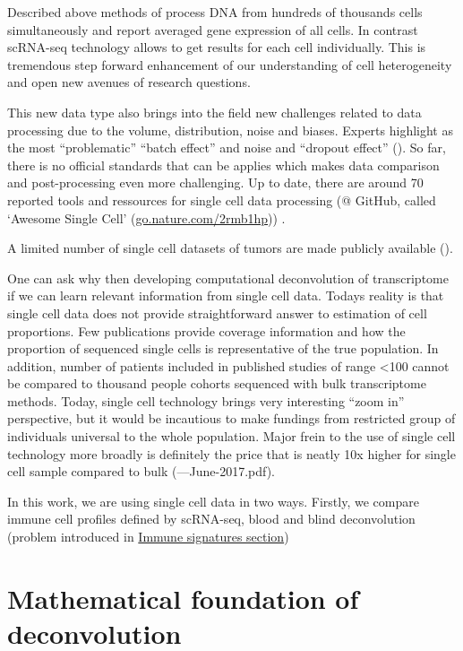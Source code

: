 \documentclass[12pt,]{book}
\theoremstyle{definition}
\theoremstyle{definition}
\theoremstyle{definition}
\theoremstyle{remark}
\begin{document}
Described above methods of process DNA from hundreds of thousands cells
simultaneously and report averaged gene expression of all cells. In
contrast scRNA-seq technology allows to get results for each cell
individually. This is tremendous step forward enhancement of our
understanding of cell heterogeneity and open new avenues of research
questions.

This new data type also brings into the field new challenges related to
data processing due to the volume, distribution, noise and biases.
Experts highlight as the most ``problematic'' ``batch effect'' and noise
and ``dropout effect''
(\citet{https://www.nature.com/news/single-cell-sequencing-made-simple-1.22233}).
So far, there is no official standards that can be applies which makes
data comparison and post-processing even more challenging. Up to date,
there are around 70 reported tools and ressources for single cell data
processing (@ GitHub, called `Awesome Single Cell'
(\href{http://go.nature.com/2rmb1hp}{go.nature.com/2rmb1hp})) .

A limited number of single cell datasets of tumors are made publicly
available (\citet{TABLE}).

One can ask why then developing computational deconvolution of
transcriptome if we can learn relevant information from single cell
data. Todays reality is that single cell data does not provide
straightforward answer to estimation of cell proportions. Few
publications provide coverage information and how the proportion of
sequenced single cells is representative of the true population. In
addition, number of patients included in published studies of range
\textless{}100 cannot be compared to thousand people cohorts sequenced
with bulk transcriptome methods. Today, single cell technology brings
very interesting ``zoom in'' perspective, but it would be incautious to
make fundings from restricted group of individuals universal to the
whole population. Major frein to the use of single cell technology more
broadly is definitely the price that is neatly 10x higher for single
cell sample compared to bulk
(\citet{https://www.cedars-sinai.edu/Research/Research-Cores/Genomics-Core/Documents/Single-Cell-Genomics-Pricing}---June-2017.pdf).

In this work, we are using single cell data in two ways. Firstly, we
compare immune cell profiles defined by scRNA-seq, blood and blind
deconvolution (problem introduced in
\protect\hyperlink{immune-signatures}{Immune signatures section})

\hypertarget{methods}{%
\chapter{Mathematical foundation of deconvolution}\label{methods}}
\end{document}

